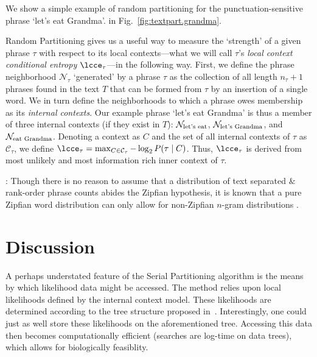 We show a simple example of random partitioning for the
punctuation-sensitive phrase `let's eat Grandma'.  in
Fig.~\ref{fig:textpart.grandma}.



Random Partitioning gives us a useful way to measure
the `strength' of a given phrase $\tau$ with respect to its local contexts---what we will
call $\tau$'s \textit{local context conditional entropy} $\lcce_\tau$---in the following way.
First, we define the phrase neighborhood $\mathcal{N}_\tau$
`generated' by a phrase $\tau$ as the collection of
all length $n_{\tau}+1$ phrases found in the text $T$
that can be formed from $\tau$ by an insertion of a single word.
We in turn define the neighborhoods to which a phrase 
owes membership as its \textit{internal contexts}.
Our example phrase `let's eat Grandma' 
is thus a member of three internal
contexts (if they exist in $T$): 
$\mathcal{N}_{\textnormal{let's eat}}$, 
$\mathcal{N}_{\textnormal{let's Grandma}}$, 
and $\mathcal{N}_{\textnormal{eat Grandma}}$.
Denoting a context as $C$ and the set of all
internal contexts of $\tau$ as $\mathcal{C}_\tau$, we define 
$\lcce_\tau = \max_{C \in \mathcal{C}_\tau} - \log_{2} P(\tau \mid C)$.
Thus, $\lcce_\tau$ is derived from 
most unlikely and most information rich
inner context of $\tau$.

: Though there is no reason to assume that a distribution of text
separated $\&$ rank-order phrase counts abides the Zipfian hypothesis,
it is known that a pure Zipfian word distribution can only allow for
non-Zipfian $n$-gram distributions \cite{egghe????a}.



\section{Discussion}
\label{sec:textpart.discussion}

A perhaps understated feature of the Serial Partitioning algorithm is
the means by which likelihood data might be accessed.
The method relies upon local likelihoods defined by the internal
context model. 
These likelihoods are determined according to the tree structure
proposed in~\cite{???}.
Interestingly, one could just as well store these likelihoods on the
aforementioned tree.
Accessing this data then becomes computationally efficient (searches
are log-time on data trees), which allows for biologically feasiblity. 

